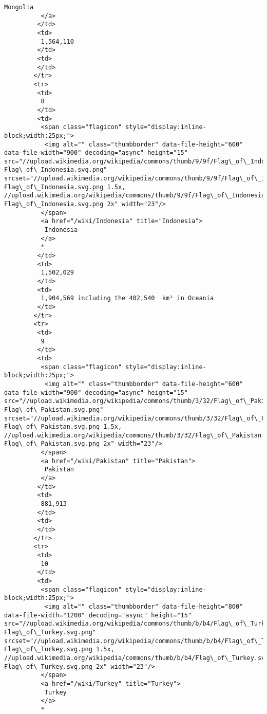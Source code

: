 \documentclass[11pt]{article}
\begin{document}
\begin{Verbatim}[commandchars=\\\{\}]
           Mongolia
          </a>
         </td>
         <td>
          1,564,110
         </td>
         <td>
         </td>
        </tr>
        <tr>
         <td>
          8
         </td>
         <td>
          <span class="flagicon" style="display:inline-block;width:25px;">
           <img alt="" class="thumbborder" data-file-height="600" data-file-width="900" decoding="async" height="15" src="//upload.wikimedia.org/wikipedia/commons/thumb/9/9f/Flag\_of\_Indonesia.svg/23px-Flag\_of\_Indonesia.svg.png" srcset="//upload.wikimedia.org/wikipedia/commons/thumb/9/9f/Flag\_of\_Indonesia.svg/35px-Flag\_of\_Indonesia.svg.png 1.5x, //upload.wikimedia.org/wikipedia/commons/thumb/9/9f/Flag\_of\_Indonesia.svg/45px-Flag\_of\_Indonesia.svg.png 2x" width="23"/>
          </span>
          <a href="/wiki/Indonesia" title="Indonesia">
           Indonesia
          </a>
          *
         </td>
         <td>
          1,502,029
         </td>
         <td>
          1,904,569 including the 402,540  km² in Oceania
         </td>
        </tr>
        <tr>
         <td>
          9
         </td>
         <td>
          <span class="flagicon" style="display:inline-block;width:25px;">
           <img alt="" class="thumbborder" data-file-height="600" data-file-width="900" decoding="async" height="15" src="//upload.wikimedia.org/wikipedia/commons/thumb/3/32/Flag\_of\_Pakistan.svg/23px-Flag\_of\_Pakistan.svg.png" srcset="//upload.wikimedia.org/wikipedia/commons/thumb/3/32/Flag\_of\_Pakistan.svg/35px-Flag\_of\_Pakistan.svg.png 1.5x, //upload.wikimedia.org/wikipedia/commons/thumb/3/32/Flag\_of\_Pakistan.svg/45px-Flag\_of\_Pakistan.svg.png 2x" width="23"/>
          </span>
          <a href="/wiki/Pakistan" title="Pakistan">
           Pakistan
          </a>
         </td>
         <td>
          881,913
         </td>
         <td>
         </td>
        </tr>
        <tr>
         <td>
          10
         </td>
         <td>
          <span class="flagicon" style="display:inline-block;width:25px;">
           <img alt="" class="thumbborder" data-file-height="800" data-file-width="1200" decoding="async" height="15" src="//upload.wikimedia.org/wikipedia/commons/thumb/b/b4/Flag\_of\_Turkey.svg/23px-Flag\_of\_Turkey.svg.png" srcset="//upload.wikimedia.org/wikipedia/commons/thumb/b/b4/Flag\_of\_Turkey.svg/35px-Flag\_of\_Turkey.svg.png 1.5x, //upload.wikimedia.org/wikipedia/commons/thumb/b/b4/Flag\_of\_Turkey.svg/45px-Flag\_of\_Turkey.svg.png 2x" width="23"/>
          </span>
          <a href="/wiki/Turkey" title="Turkey">
           Turkey
          </a>
          *

\end{Verbatim}
\end{document}
